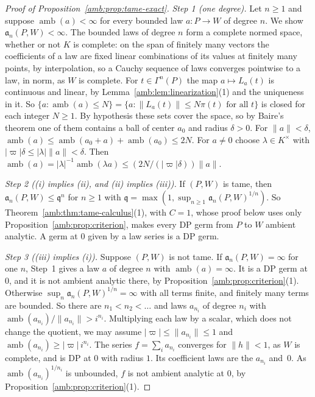 \documentclass[11pt]{amsart}
\theoremstyle{definition}
\theoremstyle{remark}
\numberwithin{equation}{section}
\newcommand{\abs}[1]{\lvert #1\rvert}
\newcommand{\norm}[1]{\lVert #1\rVert}
\theoremstyle{plain}
\theoremstyle{definition}
\theoremstyle{plain}
\begin{document}
\begin{proof}[Proof of Proposition~\ref{amb:prop:tame-exact}]
\emph{Step 1 (one degree).} Let $n\ge1$ and suppose $\operatorname{amb}(a)<\infty$ for every bounded law $a\colon P\to W$ of
degree $n$. We show $\mathfrak a_n(P,W)<\infty$. The bounded laws of degree $n$ form a complete normed space, whether or not $K$ is
complete: on the span of finitely many vectors the coefficients of a law are fixed linear combinations of its values at
finitely many points, by interpolation, so a Cauchy sequence of laws converges pointwise to a law, in norm, as $W$ is
complete. For $t\in\Gamma^n(P)$ the map $a\mapsto L_a(t)$ is continuous and linear, by Lemma~\ref{amb:lem:linearization}(1) and the uniqueness in it. So
$\{a:\operatorname{amb}(a)\le N\}=\{a:\norm{L_a(t)}\le N\pi(t)\text{ for all }t\}$ is closed for each integer $N\ge1$. By
hypothesis these sets cover the space, so by Baire's theorem one of them contains a ball of center $a_0$ and radius
$\delta>0$. For $\norm a<\delta$, $\operatorname{amb}(a)\le\operatorname{amb}(a_0+a)+\operatorname{amb}(a_0)\le2N$. For $a\ne0$ choose
$\lambda\in K^\times$ with $\abs\varpi\delta\le\abs\lambda\norm a<\delta$. Then
$\operatorname{amb}(a)=\abs\lambda^{-1}\operatorname{amb}(\lambda a)\le(2N/(\abs\varpi\delta))\norm a$.

\emph{Step 2 ((i) implies (ii), and (ii) implies (iii)).} If $(P,W)$ is tame, then $\mathfrak a_n(P,W)\le\mathfrak q^n$ for $n\ge1$ with $\mathfrak q=\max(1,\sup_{n\ge1}\mathfrak a_n(P,W)^{1/n})$. So Theorem~\ref{amb:thm:tame-calculus}(1), with $C=1$, whose proof below uses
only Proposition~\ref{amb:prop:criterion}, makes every DP germ from $P$ to $W$ ambient analytic. A germ at $0$ given by a law series
is a DP germ.

\emph{Step 3 ((iii) implies (i)).} Suppose $(P,W)$ is not tame. If $\mathfrak a_n(P,W)=\infty$ for one $n$, Step~1 gives a law $a$ of
degree $n$ with $\operatorname{amb}(a)=\infty$. It is a DP germ at $0$, and it is not ambient analytic there, by
Proposition~\ref{amb:prop:criterion}(1). Otherwise $\sup_n\mathfrak a_n(P,W)^{1/n}=\infty$ with all terms finite, and finitely many terms are bounded. So there are
$n_1<n_2<\dots$ and laws $a_{n_i}$ of degree $n_i$ with $\operatorname{amb}(a_{n_i})/\norm{a_{n_i}}>i^{n_i}$. Multiplying each law by a scalar, which does not change the quotient, we may assume
$\abs\varpi\le\norm{a_{n_i}}\le1$ and $\operatorname{amb}(a_{n_i})\ge\abs\varpi\,i^{n_i}$. The series $f=\sum_ia_{n_i}$ converges
for $\norm h<1$, as $W$ is complete, and is DP at $0$ with radius $1$. Its coefficient laws are the $a_{n_i}$ and~$0$. As
$\operatorname{amb}(a_{n_i})^{1/n_i}$ is unbounded, $f$ is not ambient analytic at $0$, by
Proposition~\ref{amb:prop:criterion}(1).
\end{proof}
\end{document}
